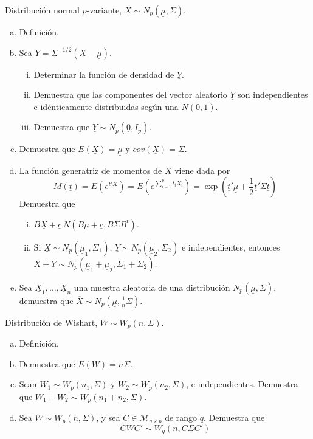\documentclass[twoside]{article}
\newcommand{\media}[1]{{\overline{#1}}}
\newcommand{\muestra}[1]{{\underline{#1}}}
\newcommand{\m}[1]{{\muestra{#1}}}
\newcommand{\mX}{{\muestra{X}}}
\begin{document}
\newpage

\begin{ejercicio}{1.2}
Distribución normal $p$-variante, $\mX \sim N_p(\m{μ},Σ)$.
\begin{enumerate}[(a)]
\item Definición.
\item Sea $\m{Y} = Σ^{-1/2}(\mX - \m{μ})$.
\begin{enumerate}[i.]
  \item Determinar la función de densidad de $\m{Y}$.
  \item Demuestra que las componentes del vector aleatorio $\m{Y}$ son independientes e idénticamente distribuidas según una $N(0,1)$.
  \item Demuestra que $\m{Y} \sim N_p(\m{0},I_p)$.
\end{enumerate}
\item Demuestra que $E(\mX) = \m{μ}$ y $cov(\m{X}) = Σ$.
\item La función generatriz de momentos de $\m{X}$ viene dada por
\[ M(\m{t}) = E\left(e^{\m{t}'\mX}\right) = E\left(e^{\sum_{i=1}^p t_i X_i}\right) = \exp\left(\m{t}'\m{μ} + \frac{1}{2}\m{t}'Σ\m{t}\right)\]
Demuestra que
\begin{enumerate}[i.]
\item $B \mX + \m{c} ~ N(B \m{μ} + \m{c}, B Σ B^t)$.
\item Si $\mX \sim N_p(\m{μ}_1,Σ_1)$, $\m{Y} \sim N_p(\m{μ}_2,Σ_2)$ e independientes, entonces $\mX+\m{Y} \sim N_p(\m{μ}_1+\m{μ}_2, Σ_1+Σ_2)$.
\end{enumerate}
\item Sea $\mX_1,\dots,\mX_n$ una muestra aleatoria de una distribución $N_p(\m{μ},Σ)$, demuestra que $\media{\m{X}} \sim N_p(\m{μ}, \frac{1}{n}Σ)$.
\end{enumerate}
\end{ejercicio}

\newpage

\begin{ejercicio}{1.3}
Distribución de Wishart, $W \sim W_p(n,Σ)$.
\begin{enumerate}[(a)]
\item Definición.
\item Demuestra que $E(W) = nΣ$.
\item Sean $W_1 \sim W_p(n_1,Σ)$ y $W_2 \sim W_p(n_2,Σ)$, e independientes. Demuestra que $W_1 + W_2 \sim W_p(n_1+n_2,Σ)$.
\item Sea $W \sim W_p(n,Σ)$, y sea $C \in \mathcal{M}_{q\times p}$ de rango $q$. Demuestra que
\[ C W C' \sim W_q(n, CΣC') \]
\end{enumerate}
\end{ejercicio}
\end{document}
